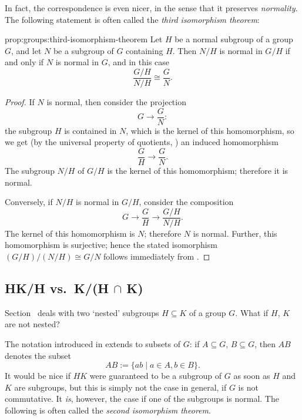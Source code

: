 In fact, the correspondence is even nicer, in the sense that it
preserves \emph{normality}. The following statement is often called
the \emph{third isomorphism theorem}:

\begin{prop}{}{prop:groups:third-isomorphism-theorem}
  Let $H$ be a normal subgroup of a group $G$, and let $N$
be a subgroup of $G$ containing $H$. Then $N/H$ is normal in $G/H$ if
and only if $N$ is normal in $G$, and in this case
\[
  \frac{G/H}{N/H} \cong \frac{G}{N}.
\]
\end{prop}
\begin{proof}
  If $N$ is normal, then consider the projection
  \[
    G \to \frac{G}{N}:
  \]
  the subgroup $H$ is contained in $N$, which is the kernel of this
  homomorphism, so we get (by the universal property of quotients,
  ) an induced
  homomorphism
  \[
    \frac{G}{H} \to \frac{G}{N}.
  \]
  The subgroup $N/H$ of $G/H$ is the kernel of this homomorphism;
  therefore it is normal.

  Conversely, if $N/H$ is normal in $G/H$, consider the composition
  \[
    G \to \frac{G}{H} \to \frac{G/H}{N/H}.
  \]
  The kernel of this homomorphism is $N$; therefore $N$ is normal.
  Further, this homomorphism is surjective; hence the stated
  isomorphism $(G/H)/(N/H) \cong G/N$ follows immediately from
  .
\end{proof}

\subsection{\texorpdfstring{HK/H vs.\ K/(H $\cap$ K)}{HK/H vs. K/(H
    cap K)}}
\label{subsec:groups:hk-h-vs-k-h-cap-k}
Section~ deals with two
`nested' subgroups $H \subseteq K$ of a group $G$. What if $H$, $K$
are not nested?

The notation introduced in 
extends to subsets of $G$: if $A \subseteq G$, $B \subseteq G$, then
$AB$ denotes the subset
\[
  AB := \{ab \mid a \in A, b \in B\}.
\]
It would be nice if $HK$ were guaranteed to be a subgroup of $G$ as
soon as $H$ and $K$ are subgroups, but this is simply not the case in
general, if $G$ is not commutative. It \emph{is}, however, the case if
one of the subgroups is normal. The following is often called the
\emph{second isomorphism theorem}.

